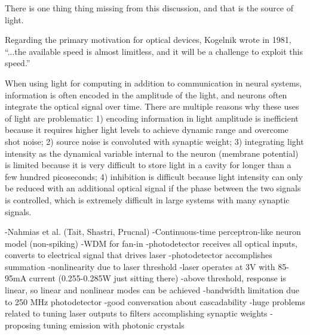 There is one thing thing missing from this discussion, and that is the source of light.


\vspace{3em}
Regarding the primary motivation for optical devices, Kogelnik wrote in 1981, ``...the available speed is almost limitless, and it will be a challenge to exploit this speed.'' \cite{ko1981}





\vspace{3em}
When using light for computing in addition to communication in neural systems, information is often encoded in the amplitude of the light, and neurons often integrate the optical signal over time. There are multiple reasons why these uses of light are problematic: 1) encoding information in light amplitude is inefficient because it requires higher light levels to achieve dynamic range and overcome shot noise; 2) source noise is convoluted with synaptic weight; 3) integrating light intensity as the dynamical variable internal to the neuron (membrane potential) is limited because it is very difficult to store light in a cavity for longer than a few hundred picoseconds; 4) inhibition is difficult because light intensity can only be reduced with an additional optical signal if the phase between the two signals is controlled, which is extremely difficult in large systems with many synaptic signals.

\cite{nata2016}
-Nahmias et al. (Tait, Shastri, Prucnal)
-Continuous-time perceptron-like neuron model (non-spiking)
-WDM for fan-in
-photodetector receives all optical inputs, converts to electrical signal that drives laser
-photodetector accomplishes summation
-nonlinearity due to laser threshold
-laser operates at 3V with 85-95mA current (0.255-0.285W just sitting there)
-above threshold, response is linear, so linear and nonlinear modes can be achieved
-bandwidth limitation due to 250 MHz photodetector
-good conversation about cascadability
-huge problems related to tuning laser outputs to filters accomplishing synaptic weights
-proposing tuning emission with photonic crystals

\cite{tafe2016}

\cite{fepe2019}

\cite{pena2018} 

